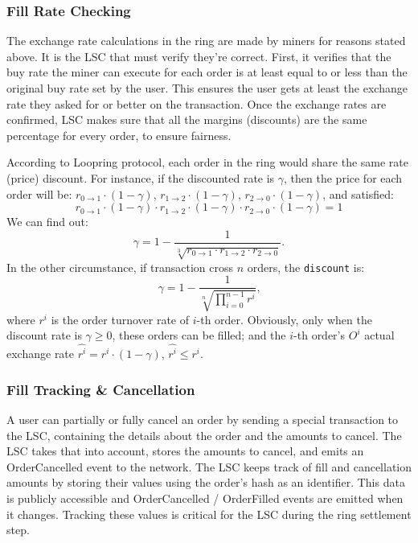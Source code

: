 \documentclass[UTF8,nofonts]{article}
\begin{document}
\subsubsection{Fill Rate Checking}
The exchange rate calculations in the ring are made by miners for reasons stated above. It is the LSC that must verify they're correct. First, it verifies that the buy rate the miner can execute for each order is at least equal to or less than the original buy rate set by the user. This ensures the user gets at least the exchange rate they asked for or better on the transaction. Once the exchange rates are confirmed, LSC makes sure that all the margins (discounts) are the same percentage for every order, to ensure fairness.

According to Loopring protocol, each order in the ring would share the same rate (price) discount. For instance, if the discounted rate is $\gamma$, then the price for each order will be:
$r_{0\rightarrow 1} \cdot (1-\gamma)$, $r_{1\rightarrow 2} \cdot (1-\gamma)$, $r_{2 \rightarrow 0} \cdot (1-\gamma)$, and satisfied: 
\begin{equation}
r_{0\rightarrow 1} \cdot (1-\gamma)\cdot r_{1\rightarrow 2} \cdot (1-\gamma) \cdot r_{2 \rightarrow 0} \cdot (1-\gamma) = 1
\end{equation}
We can find out: 
\begin{equation*}
\gamma = 1- \frac{1}{\sqrt[3]{r_{0\rightarrow 1} \cdot r_{1\rightarrow 2} \cdot r_{2\rightarrow 0}}}\text{.}
\end{equation*}
In the other circumstance, if transaction cross $n$ orders, the \texttt{discount} is: 
\begin{equation*}
\gamma = 1- \frac{1}{\sqrt[n]{\prod_{i=0}^{n-1} r^i}} \text{,}
\end{equation*}
where $r^i$ is the order turnover rate of $i$-th order. Obviously, only when the discount rate is $\gamma \ge 0$, these orders can be filled; and the $i$-th order's $O^i$ actual exchange rate $\hat{r^i} = r^i \cdot (1-\gamma)$, $\hat{r^i}\le r^i$.

\subsubsection{Fill Tracking \& Cancellation}
A user can partially or fully cancel an order by sending a special transaction to the LSC, containing the details about the order and the amounts to cancel. The LSC takes that into account, stores the amounts to cancel, and emits an OrderCancelled event to the network. The LSC keeps track of fill and cancellation amounts by storing their values using the order's hash as an identifier. This data is publicly accessible and OrderCancelled / OrderFilled events are emitted when it changes. Tracking these values is critical for the LSC during the ring settlement step.
\end{document}
